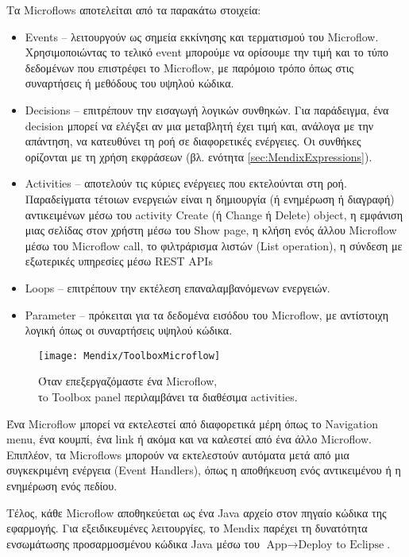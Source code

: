             Τα Microflows αποτελείται από τα παρακάτω στοιχεία:
                \begin{itemize}[label={\tiny \blacksquare}]
                    \setlength\itemsep{-0.25em}
                    \item Events -- λειτουργούν ως σημεία εκκίνησης και τερματισμού του Microflow. Χρησιμοποιώντας το τελικό event μπορούμε να ορίσουμε την τιμή και το τύπο δεδομένων που επιστρέφει το Microflow, με παρόμοιο τρόπο όπως στις συναρτήσεις ή μεθόδους του υψηλού κώδικα.
                    \item Decisions -- επιτρέπουν την εισαγωγή λογικών συνθηκών. Για παράδειγμα, ένα decision μπορεί να ελέγξει αν μια μεταβλητή έχει τιμή και, ανάλογα με την απάντηση, να κατευθύνει τη ροή σε διαφορετικές ενέργειες. Οι συνθήκες ορίζονται με τη χρήση εκφράσεων (βλ. ενότητα \ref{sec:MendixExpressions}).
                    \item Activities -- αποτελούν τις κύριες ενέργειες που εκτελούνται στη ροή. Παραδείγματα τέτοιων ενεργειών είναι η δημιουργία (ή ενημέρωση ή διαγραφή) αντικειμένων μέσω του activity Create (ή Change ή Delete) object, η εμφάνιση μιας σελίδας στον χρήστη μέσω του Show page, η κλήση ενός άλλου Microflow μέσω του Microflow call, το φιλτράρισμα λιστών (List operation), η σύνδεση με εξωτερικές υπηρεσίες μέσω REST APIs
                    \item Loops --  επιτρέπουν την εκτέλεση επαναλαμβανόμενων ενεργειών.
                    \item Parameter -- πρόκειται για τα δεδομένα εισόδου του Microflow, με αντίστοιχη λογική όπως οι συναρτήσεις υψηλού κώδικα.
                \end{itemize}

            \begin{figure}[h!] \noindent \centering
                    \texttt{[image: Mendix/ToolboxMicroflow]}
                    \caption{\centering Όταν επεξεργαζόμαστε ένα Microflow, \\ τo Toolbox panel περιλαμβάνει τα διαθέσιμα activities.}
            \end{figure}
            Ένα Microflow μπορεί να εκτελεστεί από διαφορετικά μέρη όπως το Navigation menu, ένα κουμπί, ένα link ή ακόμα και να καλεστεί από ένα άλλο Microflow. Επιπλέον, τα Microflows μπορούν να εκτελεστούν αυτόματα μετά από μια συγκεκριμένη ενέργεια (Event Handlers), όπως η αποθήκευση ενός αντικειμένου ή η ενημέρωση ενός πεδίου.

            Τέλος, κάθε Microflow αποθηκεύεται ως ένα Java αρχείο στον πηγαίο κώδικα της εφαρμογής. Για εξειδικευμένες λειτουργίες, το Mendix παρέχει τη δυνατότητα ενσωμάτωσης προσαρμοσμένου κώδικα Java μέσω του $ \text{App} \rightarrow \text{Deploy to Eclipse} $.

